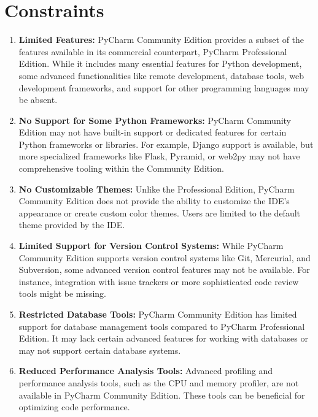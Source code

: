 \section{Constraints}
\begin{enumerate}
	\item \textbf{Limited Features:} PyCharm Community Edition provides a subset of the features available in its commercial counterpart, PyCharm Professional Edition. While it includes many essential features for Python development, some advanced functionalities like remote development, database tools, web development frameworks, and support for other programming languages may be absent.
	
	\item \textbf{No Support for Some Python Frameworks:} PyCharm Community Edition may not have built-in support or dedicated features for certain Python frameworks or libraries. For example, Django support is available, but more specialized frameworks like Flask, Pyramid, or web2py may not have comprehensive tooling within the Community Edition.
	
	\item \textbf{No Customizable Themes:} Unlike the Professional Edition, PyCharm Community Edition does not provide the ability to customize the IDE's appearance or create custom color themes. Users are limited to the default theme provided by the IDE.
	
	\item \textbf{Limited Support for Version Control Systems:} While PyCharm Community Edition supports version control systems like Git, Mercurial, and Subversion, some advanced version control features may not be available. For instance, integration with issue trackers or more sophisticated code review tools might be missing.
	
	\item \textbf{Restricted Database Tools:} PyCharm Community Edition has limited support for database management tools compared to PyCharm Professional Edition. It may lack certain advanced features for working with databases or may not support certain database systems.
	
	\item \textbf{Reduced Performance Analysis Tools:} Advanced profiling and performance analysis tools, such as the CPU and memory profiler, are not available in PyCharm Community Edition. These tools can be beneficial for optimizing code performance.
\end{enumerate}

